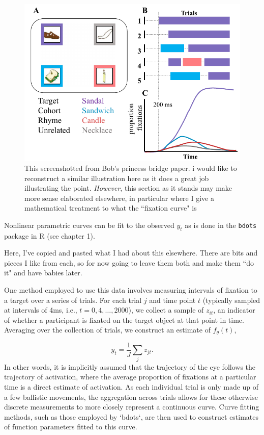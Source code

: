 \documentclass{article}
\newcommand{\xt}{\texttt}%
\begin{document}
\begin{figure}
\centering
\includegraphics[scale=0.45]{bob_vwp_full.png}
\caption{This screenshotted from Bob's princess bridge paper. i would like to reconstruct a similar illustration here as it does a great job illustrating the point. \textit{However}, this section as it stands may make more sense elaborated elsewhere, in particular where I give a mathematical treatment to what the ``fixation curve" is}
\label{fig:bob_diagram_full}
\end{figure}

Nonlinear parametric curves can be fit to the observed $y_t$ as is done in the \xt{bdots} package in R (see chapter 1).

Here, I've copied and pasted what I had about this elsewhere. There are bits and pieces I like from each, so for now going to leave them both and make them ``do it" and have babies later. 

One method employed to use this data involves measuring intervals of fixation to a target over a series of trials. For each trial $j$ and time point $t$ (typically sampled at intervals of 4ms, i.e., $t = 0, 4, \dots, 2000$), we collect a sample of $z_{it}$, an indicator of whether a participant is fixated on the target object at that point in time. Averaging over the collection of trials, we construct an estimate of $f_{\theta}(t)$, 

$$
y_t = \frac{1}{J} \sum_{j} z_{jt}.
$$
In other words, it is implicitly assumed that the trajectory of the eye follows the trajectory of activation, where the average proportion of fixations at a particular time is a direct estimate of activation. As each individual trial is only made up of a few ballistic movements, the aggregation across trials allows for these otherwise discrete measurements to more closely represent a continuous curve. Curve fitting methods, such as those employed by `bdots`, are then used to construct estimates of function parameters fitted to this curve.
\end{document}
